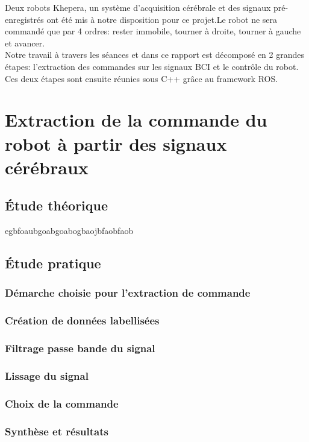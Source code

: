 \documentclass[11pt]{article}
\begin{document}
\noindent Deux robots Khepera, un système d'acquisition cérébrale et des signaux pré-enregistrés ont été mis à notre disposition pour ce projet.Le robot ne sera commandé que par 4 ordres: rester immobile, tourner à droite, tourner à gauche et avancer.\\

\noindent Notre travail à travers les séances et dans ce rapport est décomposé en 2 grandes étapes: l'extraction des commandes sur les signaux BCI et le contrôle du robot. Ces deux étapes sont ensuite réunies sous C++ grâce au framework ROS.


\cleardoublepage


\section{Extraction de la commande du robot à partir des signaux cérébraux}

\subsection{Étude théorique}
egbfoaubgoabgoabogbaojbfaobfaob

\cleardoublepage

\subsection{Étude pratique}
\subsubsection{Démarche choisie pour l'extraction de commande}
\subsubsection{Création de données labellisées}
\subsubsection{Filtrage passe bande du signal}
\subsubsection{Lissage du signal}
\subsubsection{Choix de la commande}
\subsubsection{Synthèse et résultats}
\end{document}

